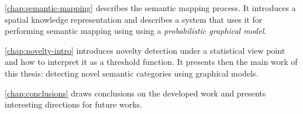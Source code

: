 \autoref{chap:semantic-mapping} describes the semantic mapping process.
It introduces a spatial knowledge representation and describes a system
that uses it for performing semantic mapping using using a \emph{probabilistic graphical model}.

\autoref{chap:novelty-intro} introduces novelty detection under a
statistical view point and how to interpret it as a threshold function.
It presents then the main work of this thesis: detecting novel semantic
categories using graphical models.

\autoref{chap:conclusions} draws conclusions on the developed work and presents
interesting directions for future works.



